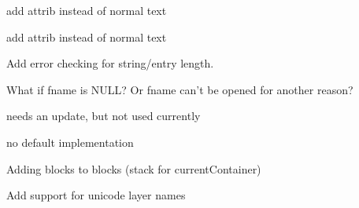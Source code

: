 
\begin{DoxyRefList}
\item[\label{todo__todo000002}%
\hypertarget{todo__todo000002}{}%
Member \hyperlink{classDL__Jww_a17c123f29e2ac263c92a1726080bacbc}{D\-L\-\_\-\-Jww\-:\-:add\-Attrib} (\hyperlink{classDL__CreationInterface}{D\-L\-\_\-\-Creation\-Interface} $\ast$creation\-Interface)]add attrib instead of normal text 

add attrib instead of normal text  
\item[\label{todo__todo000004}%
\hypertarget{todo__todo000004}{}%
Class \hyperlink{classDL__Writer}{D\-L\-\_\-\-Writer} ]Add error checking for string/entry length.  
\item[\label{todo__todo000005}%
\hypertarget{todo__todo000005}{}%
Class \hyperlink{classDL__WriterA}{D\-L\-\_\-\-Writer\-A} ]What if {\ttfamily fname} is N\-U\-L\-L? Or {\ttfamily fname} can't be opened for another reason?  
\item[\label{todo__todo000017}%
\hypertarget{todo__todo000017}{}%
Member \hyperlink{classQG__LineTypeBox_ac3569be5207581a572548b91f3ac5bc6}{Q\-G\-\_\-\-Line\-Type\-Box\-:\-:set\-Layer\-Line\-Type} (\hyperlink{classRS2_a6f3a82972c2d62456f6cacb74e14c95f}{R\-S2\-::\-Line\-Type} w)]needs an update, but not used currently  
\item[\label{todo__todo000006}%
\hypertarget{todo__todo000006}{}%
Member \hyperlink{classRS__ActionInterface_af877a66b5b4a7053f2b1f0519c57a6f5}{R\-S\-\_\-\-Action\-Interface\-:\-:rtti} ()]no default implementation  
\item[\label{todo__todo000008}%
\hypertarget{todo__todo000008}{}%
Member \hyperlink{classRS__ConstructionLine_aab074571db2a8f7f3acbec8f8b22e2ce}{R\-S\-\_\-\-Construction\-Line\-:\-:get\-Endpoint} () const ]
\item[\label{todo__todo000007}%
\hypertarget{todo__todo000007}{}%
Member \hyperlink{classRS__ConstructionLine_a43a9cab90975063683e955f96bcddfb2}{R\-S\-\_\-\-Construction\-Line\-:\-:get\-Startpoint} () const ]
\item[\label{todo__todo000010}%
\hypertarget{todo__todo000010}{}%
Member \hyperlink{classRS__FilterDXF_ac4f4aa3c6f02af2bc14e908d2d1a4c82}{R\-S\-\_\-\-Filter\-D\-X\-F\-:\-:add\-Block} (const \hyperlink{structDL__BlockData}{D\-L\-\_\-\-Block\-Data} \&data)]Adding blocks to blocks (stack for current\-Container)  
\item[\label{todo__todo000011}%
\hypertarget{todo__todo000011}{}%
Member \hyperlink{classRS__FilterDXF_a372bc14125237315791f2cee18d8ac22}{R\-S\-\_\-\-Filter\-D\-X\-F\-:\-:write\-Layer} (\hyperlink{classDL__WriterA}{D\-L\-\_\-\-Writer\-A} \&dw, \hyperlink{classRS__Layer}{R\-S\-\_\-\-Layer} $\ast$l)]Add support for unicode layer names  

\end{DoxyRefList}
